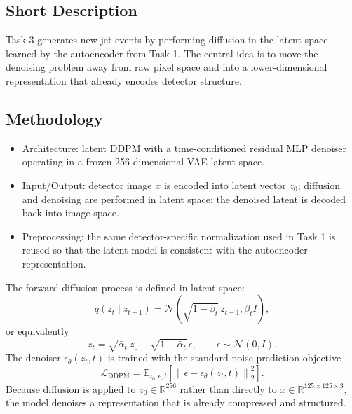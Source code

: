 \documentclass[11pt]{article}
\begin{document}
\subsection{Short Description}
Task 3 generates new jet events by performing diffusion in the latent space learned by the autoencoder from Task 1. The central idea is to move the denoising problem away from raw pixel space and into a lower-dimensional representation that already encodes detector structure.

\subsection{Methodology}
\begin{itemize}
    \item Architecture: latent DDPM with a time-conditioned residual MLP denoiser operating in a frozen 256-dimensional VAE latent space.
    \item Input/Output: detector image $x$ is encoded into latent vector $z_0$; diffusion and denoising are performed in latent space; the denoised latent is decoded back into image space.
    \item Preprocessing: the same detector-specific normalization used in Task 1 is reused so that the latent model is consistent with the autoencoder representation.
\end{itemize}

The forward diffusion process is defined in latent space:
\[
q(z_t \mid z_{t-1}) = \mathcal{N}\!\left(\sqrt{1-\beta_t}\,z_{t-1}, \beta_t I\right),
\]
or equivalently
\[
z_t = \sqrt{\bar{\alpha}_t}\,z_0 + \sqrt{1-\bar{\alpha}_t}\,\epsilon,
\qquad
\epsilon \sim \mathcal{N}(0,I).
\]
The denoiser $\epsilon_{\theta}(z_t,t)$ is trained with the standard noise-prediction objective
\[
\mathcal{L}_{\mathrm{DDPM}}
=
\mathbb{E}_{z_0,\epsilon,t}
\left[
\left\|
\epsilon - \epsilon_{\theta}(z_t,t)
\right\|_2^2
\right].
\]
Because diffusion is applied to $z_0 \in \mathbb{R}^{256}$ rather than directly to $x \in \mathbb{R}^{125 \times 125 \times 3}$, the model denoises a representation that is already compressed and structured.
\end{document}
